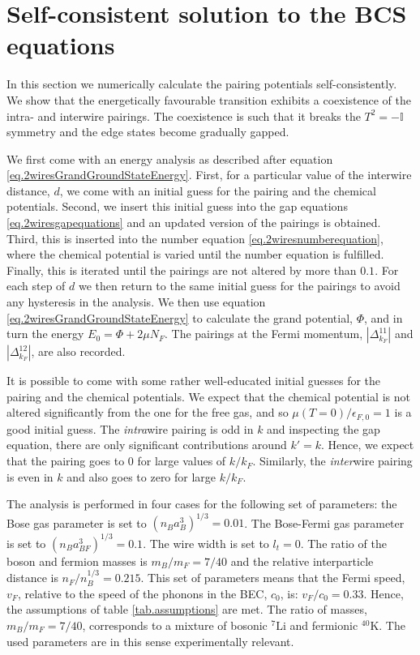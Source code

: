 \section{Self-consistent solution to the BCS equations}
\label{sec.2wiresCrossover_energy}
In this section we numerically calculate the pairing potentials self-consistently. We show that the energetically favourable transition exhibits a coexistence of the intra- and interwire pairings. The coexistence is such that it breaks the $T^2 = -\mathbb{I}$ symmetry and the edge states become gradually gapped. 

We first come with an energy analysis as described after equation \eqref{eq.2wiresGrandGroundStateEnergy}. First, for a particular value of the interwire distance, $d$, we come with an initial guess for the pairing and the chemical potentials. Second, we insert this initial guess into the gap equations \eqref{eq.2wiresgapequations} and an updated version of the pairings is obtained. Third, this is inserted into the number equation \eqref{eq.2wiresnumberequation}, where the chemical potential is varied until the number equation is fulfilled. Finally, this is iterated until the pairings are not altered by more than $0.1$\textperthousand. For each step of $d$ we then return to the same initial guess for the pairings to avoid any hysteresis in the analysis. We then use equation \eqref{eq.2wiresGrandGroundStateEnergy} to calculate the grand potential, $\Phi$, and in turn the energy $E_0 = \Phi + 2\mu N_F$. The pairings at the Fermi momentum, $|\Delta^{11}_{k_F}|$ and $|\Delta^{12}_{k_F}|$, are also recorded. 

It is possible to come with some rather well-educated initial guesses for the pairing and the chemical potentials. We expect that the chemical potential is not altered significantly from the one for the free gas, and so $\mu(T = 0)/\epsilon_{F,0} = 1$ is a good initial guess. The \textit{intra}wire pairing is odd in $k$ and inspecting the gap equation, there are only significant contributions around $k' = k$. Hence, we expect that the pairing goes to 0 for large values of $k/k_F$. Similarly, the \textit{inter}wire pairing is even in $k$ and also goes to zero for large $k / k_F$. 

The analysis is performed in four cases for the following set of parameters: the Bose gas parameter is set to $(n_Ba_B^3)^{1/3} = 0.01$. The Bose-Fermi gas parameter is set to $(n_Ba_{BF}^3)^{1/3} = 0.1$. The wire width is set to $l_t = 0$. The ratio of the boson and fermion masses is $m_B / m_F = 7/40$ and the relative interparticle distance is $n_F / n_B^{1/3} = 0.215$. This set of parameters means that the Fermi speed, $v_F$, relative to the speed of the phonons in the BEC, $c_0$, is: $v_F/c_0 = 0.33$. Hence, the assumptions of table \ref{tab.assumptions} are met. The ratio of masses, $m_B / m_F = 7 / 40$, corresponds to a mixture of bosonic $^{7}\text{Li}$ and fermionic $^{40}\text{K}$. The used parameters are in this sense experimentally relevant.   


